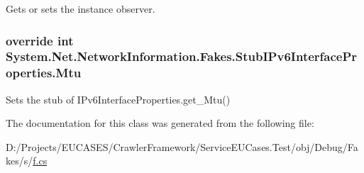 Gets or sets the instance observer.

\hypertarget{class_system_1_1_net_1_1_network_information_1_1_fakes_1_1_stub_i_pv6_interface_properties_af25ea71268c107a10d1c86f0550d9be0}{
\subsubsection[{Mtu}]{\setlength{\rightskip}{0pt plus 5cm}override int System.\-Net.\-Network\-Information.\-Fakes.\-Stub\-I\-Pv6\-Interface\-Properties.\-Mtu\hspace{0.3cm}{\ttfamily [get]}}}\label{class_system_1_1_net_1_1_network_information_1_1_fakes_1_1_stub_i_pv6_interface_properties_af25ea71268c107a10d1c86f0550d9be0}


Sets the stub of I\-Pv6\-Interface\-Properties.\-get\-\_\-\-Mtu()



The documentation for this class was generated from the following file\-:\begin{DoxyCompactItemize}
\item 
D\-:/\-Projects/\-E\-U\-C\-A\-S\-E\-S/\-Crawler\-Framework/\-Service\-E\-U\-Cases.\-Test/obj/\-Debug/\-Fakes/s/\hyperlink{s_2f_8cs}{f.\-cs}\end{DoxyCompactItemize}
